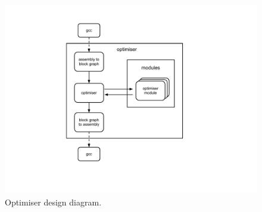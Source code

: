 \begin{figure}[h]
\centering
\includegraphics[viewport= 170 90 510 490, clip=true]{diagram}
\caption{Optimiser design diagram.}
\label{fig:diagram}
\end{figure}
